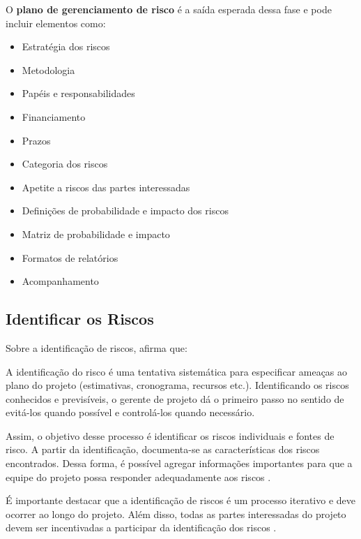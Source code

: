 \documentclass[
    12pt,       %
    openright,      %
    twoside,      %
    a4paper,      %
    english,      %
    french,       %
    spanish,      %
    brazil,       %
    ]{abntex2}
\begin{document}
O \textbf{plano de gerenciamento de risco} é a saída esperada dessa fase e pode incluir elementos como:

\begin{itemize}
    \item Estratégia dos riscos
    \item Metodologia
    \item Papéis e responsabilidades
    \item Financiamento
    \item Prazos
    \item Categoria dos riscos
    \item Apetite a riscos das partes interessadas
    \item Definições de probabilidade e impacto dos riscos
    \item Matriz de probabilidade e impacto
    \item Formatos de relatórios
    \item Acompanhamento
\end{itemize}

\subsection{Identificar os Riscos}

Sobre a identificação de riscos,  afirma que:

\begin{changemargin}{4cm}{0cm}
\begin{footnotesize}
A identificação do risco é uma tentativa sistemática para especificar ameaças ao plano do projeto (estimativas, cronograma, recursos etc.). Identificando os riscos conhecidos e previsíveis, o gerente de projeto dá o primeiro passo no sentido de evitá-los quando possível e controlá-los quando necessário.
\end{footnotesize}
\end{changemargin}

Assim, o objetivo desse processo é identificar os riscos individuais e fontes de risco. A partir da identificação, documenta-se as características dos riscos encontrados. Dessa forma, é possível agregar informações importantes para que a equipe do projeto possa responder adequadamente aos riscos \cite{PMBOK:2017}.

É importante destacar que a identificação de riscos é um processo iterativo e deve ocorrer ao longo do projeto. Além disso, todas as partes interessadas do projeto devem ser incentivadas a participar da identificação dos riscos \cite{PMBOK:2017}. 
\end{document}
